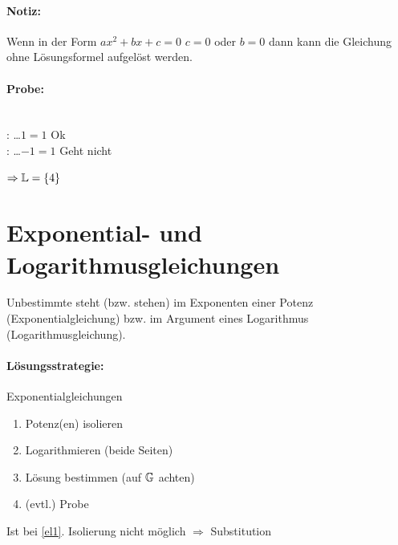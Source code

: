 \paragraph{Notiz:}
Wenn in der Form $ax^2+bx+c=0$ $c=0$ oder $b=0$ dann kann die Gleichung ohne Lösungsformel aufgelöst werden.

\paragraph{Probe:} \quad\\
: \ldots $1=1$ Ok\\
: \ldots $-1=1$ Geht nicht

$\Rightarrow \mathbb{L}=\{4\}$

\clearpage
\section{Exponential- und Logarithmusgleichungen}
Unbestimmte steht (bzw. stehen) im Exponenten einer Potenz (Exponentialgleichung) bzw. im Argument eines Logarithmus (Logarithmusgleichung).

\paragraph{Lösungsstrategie:} Exponentialgleichungen
\begin{enumerate}
	\item\label{el1} Potenz(en) isolieren
	\item Logarithmieren (beide Seiten)
	\item Lösung bestimmen (auf $\mathbb{G}$ achten)
	\item (evtl.) Probe
\end{enumerate}

Ist bei \ref*{el1}. Isolierung nicht möglich $\Rightarrow$ Substitution



